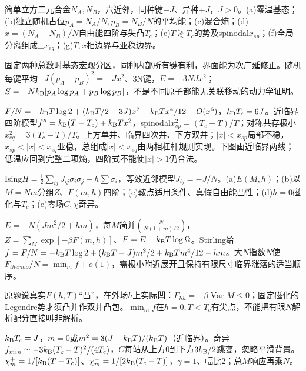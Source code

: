 \begin{exercise}[原题1(a)--(g)]\label{r:334-1-1}
简单立方二元合金$N_A,N_B$，六近邻，同种键$-J$、异种$+J$，$J>0$。(a)零温基态；(b)独立随机占位$p_A=N_A/N,p_B=N_B/N$的平均能；(c)混合熵；(d)$x=(N_A-N_B)/N$自由能四阶与失凸$T_c$；(e)$T\gtrless T_c$的势及spinodal$x_{sp}$；(f)全局分离组成$\pm x_{eq}$；(g)$T,x$相边界与亚稳边界。
\end{exercise}
\begin{solution}
固定两种总数时基态宏观分区，同种内部所有键有利，界面能为次广延修正。随机每键平均$-J(p_A-p_B)^2=-Jx^2$、3N键，$E=-3NJx^2$；$S=-Nk_{\mathrm B}[p_A\log p_A+p_B\log p_B]$，不是不同原子都能无关联移动的动力学证明。

$F/N=-k_{\mathrm B} T\log2+(k_{\mathrm B} T/2-3J)x^2+k_{\mathrm B} Tx^4/12+O(x^6)$，$k_{\mathrm B} T_c=6J$。近临界四阶模型$f''=k_{\mathrm B}(T-T_c)+k_{\mathrm B} Tx^2$，spinodal$x_{sp}^2=(T_c-T)/T$；对称共存极小$x_{eq}^2=3(T_c-T)/T$。上方单井、临界四次井、下方双井；$|x|<x_{sp}$局部不稳，$x_{sp}<|x|<x_{eq}$亚稳，总组成$|x|<x_{eq}$由两相杠杆规则实现。下图画近临界两线；低温应回到完整二项熵，四阶式不能使$|x|>1$仍合法。
\begin{center}\end{center}
\end{solution}
\begin{exercise}[原题2(a)--(e)]\label{r:334-1-2}
Ising$H=\tfrac12\sum_{ij}J_{ij}\sigma_i\sigma_j-h\sum\sigma_i$，等效近邻模型$J_{ij}=-J/N$。(a)$E(M,h)$；(b)以$M=Nm$分组$Z$、$F(m,h)$四阶；(c)鞍点适用条件、真假自由能凸性；(d)$h=0$磁化与$T_c$；(e)零场$C,\chi$奇异。
\end{exercise}
\begin{solution}
$E=-N(Jm^2/2+hm)$，每$M$简并$\binom N{N(1+m)/2}$，$Z=\sum_M\exp[-\beta F(m,h)]$、$F=E-k_{\mathrm B} T\log\Omega$。Stirling给$f=F/N=-k_{\mathrm B} T\log2+(k_{\mathrm B} T-J)m^2/2+k_{\mathrm B} Tm^4/12-hm$。大$N$指数$N$使$F_{thermo}/N=\min_m f+o(1)$，需极小附近展开且保持有限尺寸临界涨落的适当顺序。

原题说真实$F(h,T)$“凸”，在外场$h$上实际\textbf{凹}：$F_{hh}=-\beta\operatorname{Var}M\le0$；固定磁化的Legendre势才须凸并作双井凸包。$\min_mf$在$h=0,T<T_c$有尖点，不能把有限$N$解析配分直接叫非解析。

$k_{\mathrm B} T_c=J$，$m=0$或$m^2=3(J-k_{\mathrm B} T)/(k_{\mathrm B} T)$（近临界）。奇异$f_{min}\simeq-3k_{\mathrm B}(T_c-T)^2/(4T_c)$，$C$每站从上方0到下方$3k_{\mathrm B}/2$跳变，忽略平滑背景。$\chi_m^+=1/[k_{\mathrm B}(T-T_c)]$、$\chi_m^-=1/[2k_{\mathrm B}(T_c-T)]$，$\gamma=1$、幅比2；总$M$响应再乘$N$。
\end{solution}
